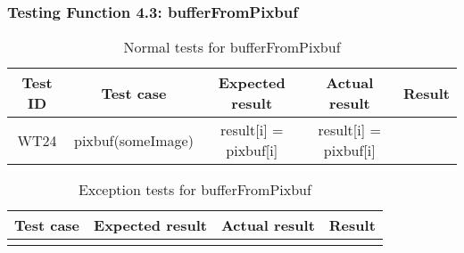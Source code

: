 \documentclass{article}
\begin{document}
\subsubsection{Testing Function 4.3: bufferFromPixbuf}
\begin{table}[H]
    \caption{Normal tests for bufferFromPixbuf}
    \label{tab:wb}
    \centering
    \begin{tabular}{|c|c|c|c||c|}
        \hline
        \textbf{Test ID} & \textbf{Test case} & \textbf{Expected result} & \textbf{Actual result} & \textbf{Result}\\
        \hline
        WT24 & pixbuf(someImage) & result[i] = pixbuf[i] & result[i] = pixbuf[i] &  \\
        \hline
    \end{tabular}
\end{table}
\begin{table}[H]
    \caption{Exception tests for bufferFromPixbuf}
    \label{tab:wb}
    \centering
    \begin{tabular}{|c|c|c||c|}
        \hline
        \textbf{Test case} & \textbf{Expected result} & \textbf{Actual result} & \textbf{Result}\\
        \hline
         &  &  &  \\
        \hline
    \end{tabular}
\end{table}
\end{document}
